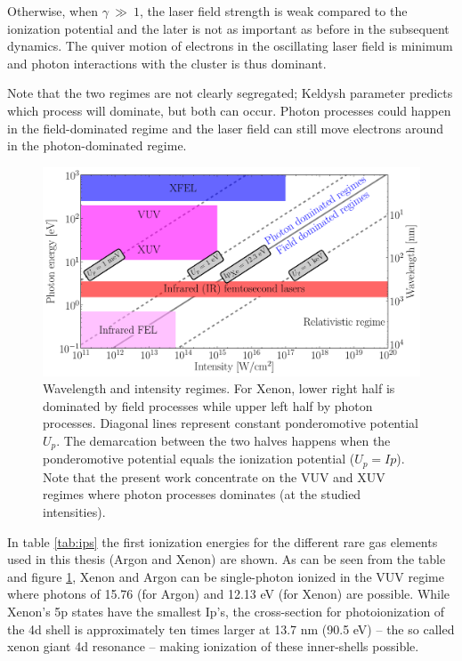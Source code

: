 Otherwise, when $\gamma~\gg~1$, the laser field strength is weak compared to
the ionization potential and the later is not as important as before in the
subsequent dynamics. The quiver motion of electrons in the oscillating laser
field is minimum and photon interactions with the cluster is thus dominant.


Note that the two regimes are not clearly segregated; Keldysh parameter
predicts which process will dominate, but both can occur.
Photon processes could happen in the field-dominated regime and the laser field
can still move electrons around in the photon-dominated regime.

\begin{figure}
\centering
\includegraphics[width=\figurewidth]{figures/regimes}
\caption{Wavelength and intensity regimes. For Xenon, lower right half is dominated
         by field processes while upper left half by photon processes. Diagonal
         lines represent constant ponderomotive potential $U_p$. The
         demarcation between the two halves happens when the ponderomotive
         potential equals the ionization potential ($U_p = Ip$).
         Note that the present work concentrate on the VUV and XUV regimes
         where photon processes dominates (at the studied intensities).}
\label{fig:regimes}
\end{figure}

In table \ref{tab:ips} the first ionization energies for the different
rare gas elements used in this thesis (Argon and Xenon) are shown. As can be
seen from the table and figure \ref{fig:regimes}, Xenon and Argon can be
single-photon ionized in the VUV regime where photons of 15.76 (for Argon)
and 12.13 eV (for Xenon) are possible. While Xenon's 5p states have the smallest
Ip's, the cross-section for photoionization of the 4d shell is approximately ten
times larger at 13.7 nm (90.5 eV) -- the so called xenon giant 4d
resonance\cite{Becker1986} -- making ionization of these inner-shells
possible\cite{Thomas2009,Ackad2013}.

